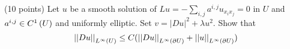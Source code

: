 (10 points)
Let $u$ be a smooth solution of $L u = -\sum_{i, j} a^{i, j} u_{x_i x_j} = 0$ in $U$
and $a^{i, j} \in C^{1}\left(U \right)$ and uniformly elliptic.
Set $v = |D u|^2 + \lambda u^2$.
Show that
\begin{align*}
  \left|\left|D u\right|\right|_{L^{\infty}(U)} \leq C (\left|\left|D u\right|\right|_{L^{\infty}(\partial U)} + \left|\left|u\right|\right|_{L^{\infty}(\partial U)})
\end{align*}
